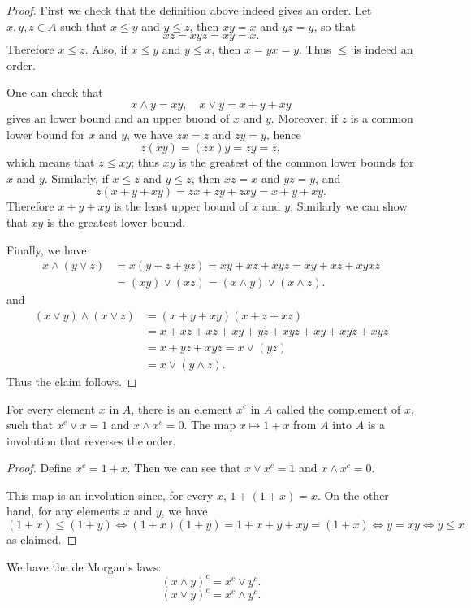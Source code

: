 \begin{proof}
First we check that the definition above indeed gives an order. Let $x,y,z\in A$ such that $x\leq y$ and $y\leq z$, then $xy=x$ and $yz=y$, so that
\[xz=xyz=xy=x.\]
Therefore $x\leq z$. Also, if $x\leq y$ and $y\leq x$, then $x=yx=y$. Thus $\leq$ is indeed an order.\par
One can check that
\[x\wedge y=xy,\quad x\vee y=x+y+xy\]
gives an lower bound and an upper buond of $x$ and $y$. Moreover, if $z$ is a common lower bound for $x$ and $y$, we have $zx=z$ and $zy=y$, hence 
\[z(xy)=(zx)y=zy=z,\] 
which means that $z\leq xy$; thus $xy$ is the greatest of the common lower bounds for $x$ and $y$. Similarly, if $x\leq z$ and $y\leq z$, then $xz=x$ and $yz=y$, and
\[z(x+y+xy)=zx+zy+zxy=x+y+xy.\]
Therefore $x+y+xy$ is the least upper bound of $x$ and $y$. Similarly we can show that $xy$ is the greatest lower bound.\par
Finally, we have
\begin{align*}
x\wedge(y\vee z)&=x(y+z+yz)=xy+xz+xyz=xy+xz+xyxz\\
&=(xy)\vee(xz)=(x\wedge y)\vee(x\wedge z).
\end{align*}
and
\begin{align*}
(x\vee y)\wedge(x\vee z)&=(x+y+xy)(x+z+xz)\\
&=x+xz+xz+xy+yz+xyz+xy+xyz+xyz\\
&=x+yz+xyz=x\vee(yz)\\
&=x\vee(y\wedge z).
\end{align*}
Thus the claim follows.
\end{proof}
\begin{proposition}\label{Bool ring complement}
For every element $x$ in $A$, there is an element $x^c$ in $A$ called the complement of $x$, such that $x^c\vee x=1$ and $x\wedge x^c=0$. The 
map $x\mapsto 1+x$ from $A$ into $A$ is a involution that reverses the order.
\end{proposition}
\begin{proof}
Define $x^c=1+x$. Then we can see that $x\vee x^c=1$ and $x\wedge x^c=0$.\par
This map is an involution since, for every $x$, $1+(1+x)=x$. On the other hand, 
for any elements $x$ and $y$, we have
\[(1+x)\leq(1+y)\iff (1+x)(1+y)=1+x+y+xy=(1+x)\iff y=xy\iff y\leq x\]
as claimed.
\end{proof}
\begin{proposition}
We have the de Morgan's laws:
\[(x\wedge y)^c=x^c\vee y^c.\]
\[(x\vee y)^c=x^c\wedge y^c.\]
\end{proposition}
